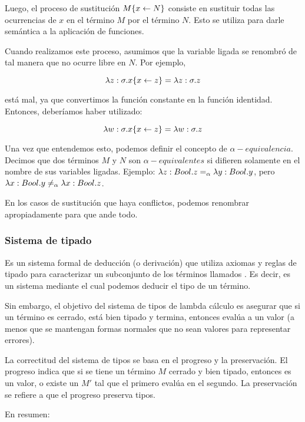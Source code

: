 Luego, el proceso de sustitución $M\{x \leftarrow N\}$ consiste en sustituir todas las ocurrencias  de $x$ en el término $M$ por el término $N$. Esto se utiliza para darle semántica a la aplicación de funciones.

Cuando realizamos este proceso, asumimos que la variable ligada se renombró de tal manera que no ocurre libre en $N$. Por ejemplo,

\[ \lambda z:\sigma.x\{x\leftarrow z\} = \lambda z:\sigma.z\]

está mal, ya que convertimos la función constante  en la función identidad. Entonces, deberíamos haber utilizado:

\[ \lambda w:\sigma.x\{x\leftarrow z\} = \lambda w:\sigma.z\]

Una vez que entendemos esto, podemos definir el concepto de $\alpha-equivalencia$. Decimos que dos términos $M$ y $N$ son $\alpha-equivalentes$ si difieren solamente en el nombre de sus variables ligadas. Ejemplo: $\lambda z:Bool.z =_{\alpha} \lambda y:Bool.y$, pero $\lambda x:Bool.y \neq_{\alpha} \lambda x:Bool.z$.

En los casos de sustitución que haya conflictos, podemos renombrar apropiadamente para que ande todo.

\subsubsection{Sistema de tipado}

Es un sistema formal de deducción (o derivación) que utiliza axiomas y reglas de tipado para caracterizar un subconjunto de los términos llamados . Es decir, es un sistema mediante el cual podemos deducir el tipo de un término.

Sin embargo, el objetivo del sistema de tipos de lambda cálculo es asegurar que si un término es cerrado, está bien tipado y termina, entonces evalúa a un valor (a menos que se mantengan formas normales que no sean valores para representar errores).

La correctitud del sistema de tipos se basa en el progreso y la preservación. El progreso indica que si se tiene un término $M$ cerrado y bien tipado, entonces es un valor, o existe un $M'$ tal que el primero evalúa en el segundo. La preservación se refiere a que el progreso preserva tipos.

En resumen:

